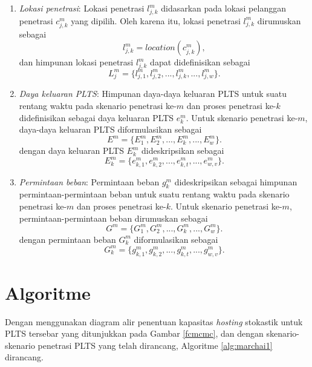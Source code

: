 \begin{enumerate}
    \item \textit{Lokasi penetrasi}:
    Lokasi penetrasi $l^m_{j,k}$  didasarkan pada lokasi pelanggan penetrasi $c^m_{j,k}$ yang dipilih. Oleh karena itu, lokasi penetrasi $l^m_{j,k}$ dirumuskan sebagai
    \begin{equation}\label{lpv1}
    l^m_{j,k}=location(c^m_{j,k}),
    \end{equation}
    dan himpunan lokasi penetrasi $l^m_{j,k}$ dapat didefinisikan sebagai
    \begin{equation}\label{lpv2}
    \mathit{L^m_j}=\{l^m_{j,1},l^m_{j,2},...,l^m_{j,k},...,l^m_{j,w}\}.
    \end{equation}
    \item \textit{Daya keluaran PLTS}: Himpunan daya-daya keluaran PLTS untuk suatu rentang waktu pada skenario penetrasi ke-$m$ dan proses penetrasi ke-$k$ didefinisikan sebagai daya keluaran PLTS $e^m_{k}$. Untuk skenario penetrasi ke-$m$, daya-daya keluaran PLTS diformulasikan sebagai
    \begin{equation}\label{dkp1}
        \mathit{E^m}=\{E^m_{1},E^m_{2},...,E^m_{k},...,E^m_{w}\}.
    \end{equation}
    dengan daya keluaran PLTS $E^m_{k}$ dideskripsikan sebagai
    \begin{equation}\label{dkp2}
        \mathit{E^m_k}=\{e^m_{k,1},e^m_{k,2},...,e^m_{k,t},...,e^m_{w,v}\}.
    \end{equation}
    \item \textit{Permintaan beban}: Permintaan beban $g^m_{k}$ dideskripsikan sebagai himpunan permintaan-permintaan beban untuk suatu rentang waktu pada skenario penetrasi ke-$m$ dan proses penetrasi ke-$k$. Untuk skenario penetrasi ke-$m$, permintaan-permintaan beban dirumuskan sebagai
    \begin{equation}\label{pb1}
        \mathit{G^m}=\{G^m_{1},G^m_{2},...,G^m_{k},...,G^m_{w}\}.
    \end{equation}
    dengan permintaan beban $G^m_{k}$ diformulasikan sebagai
    \begin{equation}\label{pb2}
        \mathit{G^m_k}=\{g^m_{k,1},g^m_{k,2},...,g^m_{k,t},...,g^m_{w,v}\}.
    \end{equation}
    
    \end{enumerate}
    
\section{Algoritme}
Dengan menggunakan diagram alir penentuan kapasitas \textit{hosting} stokastik untuk PLTS tersebar yang ditunjukkan pada Gambar \ref{fcmcmc}, dan dengan skenario-skenario penetrasi PLTS yang telah dirancang, Algoritme \ref{alg:marchai1} dirancang.

